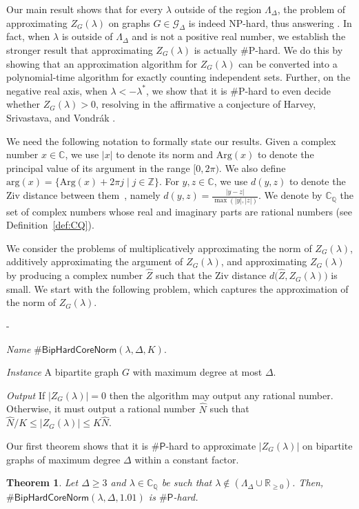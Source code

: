 \documentclass[11pt]{article}
\makeatletter
\newtheorem{theorem}{Theorem}
\renewcommand\arg{\text{arg}}
\newcommand\Arg{\text{Arg}}
\def\numP{\#\mathsf{P}}
\def\Reals{\mathbb{R}}
\def\Complex{\mathbb{C}}
\def\CQ{\mathbb{C}_{\mathbb{Q}}}
\def\LambdaD{\Lambda_\Delta}
\def\FactorHardCore#1{\#\ensuremath{\mathsf{BipHardCoreNorm}(\lambda,\Delta,#1)}}
\def\prob#1#2#3{\goodbreak\begin{list}{}{\labelwidth\z@ \itemindent-\leftmargin
                        \itemsep\z@  \topsep6\p@\@plus6\p@
                        \let\makelabel\descriptionlabel}
                \item[\it Name]#1
               \item[\it Instance]                #2
                \item[\it Output]#3
                \end{list}}
\makeatother
\begin{document}
Our main result shows that for every $\lambda$ outside of the region $\LambdaD$, 
the problem of approximating $Z_G(\lambda)$ on graphs $G \in \mathcal{G}_\Delta$
is  indeed NP-hard, thus answering \cite[Question 1]{Peters}.  In fact, when 
$\lambda$ is outside of $\LambdaD$ and  is not a positive real number, we establish the stronger result
that approximating $Z_G(\lambda)$ is actually \#P-hard. We do this by showing that an approximation algorithm for  $Z_G(\lambda)$ can be converted 
into  a polynomial-time algorithm for exactly counting independent sets.  
Further, on the negative real axis, when $\lambda < - \lambda^*$, we show that it is \#P-hard to even decide 
whether $Z_G(\lambda)>0$, resolving in the affirmative a conjecture of Harvey, Srivastava, and Vondr\'{a}k \cite[Conjecture 5.1]{Piyush}.



We need the following notation to formally state our results. Given
  a complex number   $x\in \Complex$, we use $|x|$ to denote its norm and $\Arg(x)$ to denote the principal value of its argument in the range $[0,2\pi)$. We also define $\arg(x) = \{ \Arg(x)+ 2 \pi j \mid j \in \mathbb{Z}\}$.  For $y,z\in \Complex$, we use
$d(y,z)$ to denote the Ziv distance between them~\cite{Ziv}, namely $d( y,z) = \frac{| y-z|}{\max(| y|,|z|)}$. We denote by $\CQ$ the set of complex numbers whose real and imaginary parts are rational numbers (see Definition~\ref{def:CQ}). 








We consider the problems of multiplicatively approximating the norm of $Z_G(\lambda)$, 
additively approximating the argument of $Z_G(\lambda)$, and
approximating $Z_G(\lambda)$ by producing a complex number $\widehat{Z}$
such that the Ziv distance $d\big(\widehat{Z},Z_G(\lambda)\big)$ is small. 
  We start with  the following problem, which captures
the approximation of the norm of $Z_G(\lambda)$.
\prob{
$\FactorHardCore{K}$.} 
{ A bipartite graph $G$ with maximum degree at
most $\Delta$.} 
 { If $|Z_G(\lambda)|=0$  then the algorithm may output any rational number. Otherwise,
 it must output a  rational number $\widehat{N}$ such that
$\widehat{N}/K \leq
|Z_{G}(\lambda)|\leq K \widehat{N}$.}
Our first theorem shows that it is $\numP$-hard to approximate $|Z_G(\lambda)|$ on bipartite graphs of maximum degree $\Delta$ within a constant factor.


\begin{theorem}\label{thm:norm}
Let $\Delta\geq 3$ and $\lambda\in \CQ$ be such that $\lambda\not\in (\LambdaD \cup \Reals_{\geq 0})$. Then, 
 $\FactorHardCore{1.01}$  is $\numP$-hard.\end{theorem}
\end{document}
